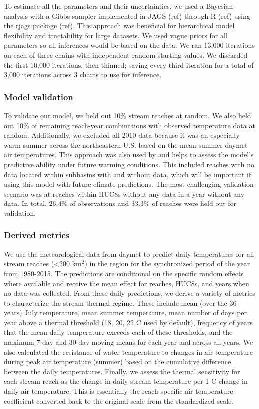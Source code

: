 \documentclass[]{article}
\begin{document}
To estimate all the parameters and their uncertainties, we used a
Bayesian analysis with a Gibbs sampler implemented in JAGS (ref) through
R (ref) using the rjags package (ref). This approach was beneficial for
hierarchical model flexibility and tractability for large datasets. We
used vague priors for all parameters so all inferences would be based on
the data. We ran 13,000 iterations on each of three chains with
independent random starting values. We discarded the first 10,000
iterations, then thinned; saving every third iteration for a total of
3,000 iterations across 3 chains to use for inference.

\subsubsection{Model validation}\label{model-validation}

To validate our model, we held out 10\% stream reaches at random. We
also held out 10\% of remaining reach-year combinations with observed
temperature data at random. Additionally, we excluded all 2010 data
because it was an especially warm summer across the northeastern U.S.
based on the mean summer daymet air temperatures. This approach was also
used by \citep{DeWeber2014a} and helps to assess the model's predictive
ability under future warming conditions. This included reaches with no
data located within subbasins with and without data, which will be
important if using this model with future climate predictions. The most
challenging validation scenario was at reaches within HUC8s without any
data in a year without any data. In total, 26.4\% of observations and
33.3\% of reaches were held out for validation.

\subsubsection{Derived metrics}\label{derived-metrics}

We use the meteorological data from daymet to predict daily temperatures
for all stream reaches (\textless{}200 km\(^2\)) in the region for the
synchronized period of the year from 1980-2015. The predictions are
conditional on the specific random effects where available and receive
the mean effect for reaches, HUC8s, and years when no data was
collected. From these daily predictions, we derive a variety of metrics
to characterize the stream thermal regime. These include mean (over the
36 years) July temperature, mean summer temperature, mean number of days
per year above a thermal threshold (18, 20, 22 C used by default),
frequency of years that the mean daily temperature exceeds each of these
thresholds, and the maximum 7-day and 30-day moving means for each year
and across all years. We also calculated the resistance of water
temperature to changes in air temperature during peak air temperature
(summer) based on the cumulative difference between the daily
temperatures. Finally, we assess the thermal sensitivity for each stream
reach as the change in daily stream temperature per 1 C change in daily
air temperature. This is essentially the reach-specific air temperature
coefficient converted back to the original scale from the standardized
scale.
\end{document}
